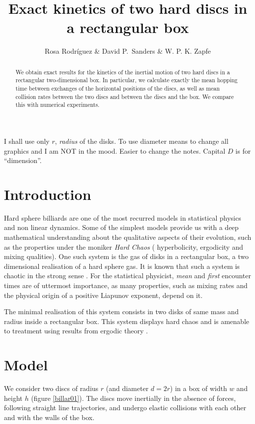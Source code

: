 \documentclass[a4paper,10pt, jcp, aps, preprint]{revtex4-1}
\title{Exact kinetics of two hard discs in a rectangular box}
\author{Rosa Rodríguez \& David P.~Sanders \& W. P. K. Zapfe}
\affil{Departamento de Física, Facultad de Ciencias, Universidad Nacional Autónoma de México, Ciudad Universitaria, Del.~Coyoacán, México D.F. 04510, Mexico}
\begin{document}
\maketitle

\begin{abstract}
  We obtain exact results for the kinetics of the inertial motion of 
two hard discs in a rectangular two-dimensional box.
  In particular,  we calculate exactly the mean hopping time between exchanges
 of the horizontal positions of the discs, 
as well as mean collision rates between the two discs and 
 between the discs and the box. We compare this with numerical experiments.
\end{abstract}


I shall use only $r$, \emph{radius} of the disks. To use diameter
means to change all graphics and I am NOT in the mood. Easier to change the notes.
Capital $D$ is for ``dimension''.

\section{Introduction}

Hard sphere billiards are one of the most recurred models in
statistical physics and non linear dynamics.  Some of the simplest models
 provide us with a deep mathematical understanding
about the qualitative aspects of their evolution, such as 
the properties under the moniker \emph{Hard Chaos} (
hyperbolicity, ergodicity and mixing qualities). One such system is the
gas of disks in a rectangular box, a two dimensional realisation of a
hard sphere gas. It is known that such a system is chaotic in the
strong sense \cite{Sinai70}. 
For the statistical physicist, \emph{mean} and \emph{first} encounter
times are of uttermost importance, as many properties,
such as mixing rates and the physical origin of a positive
Liapunov exponent, depend on it. 


The minimal realisation of this
system consists in two disks of same mass and radius inside a 
rectangular box. This system displays hard chaos and 
is amenable to treatment using
results from ergodic theory \cite{Sinai70, Gallavotti74, SzaszBook00}. 


\section{Model}

We consider two discs of radius $r$ (and diameter $d=2r$) 
in a box of width $w$ and height $h$ (figure
\ref{billar01}). 
The discs move inertially in the absence of forces, 
following straight line trajectories,
and undergo elastic collisions with each 
other and with the walls of the box.
\end{document}
